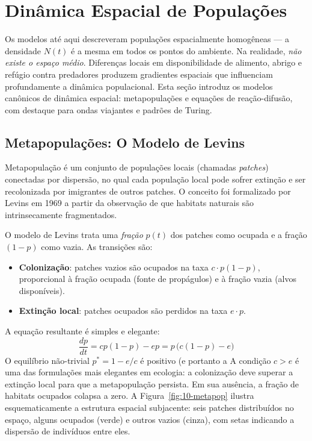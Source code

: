 \section{Dinâmica Espacial de Populações}
\label{sec:10-espaco}

Os modelos até aqui descreveram populações espacialmente homogêneas --- a
densidade $N(t)$ é a mesma em todos os pontos do ambiente. Na realidade,
\emph{não existe o espaço médio}. Diferenças locais em disponibilidade de
alimento, abrigo e refúgio contra predadores produzem gradientes espaciais
que influenciam profundamente a dinâmica populacional. Esta seção introduz
os modelos canônicos de dinâmica espacial: metapopulações e equações de
reação-difusão, com destaque para ondas viajantes e padrões de Turing.

\subsection{Metapopulações: O Modelo de Levins}
\label{sub:image10-metapop}

\begin{definicaoenv}[Metapopulação]
Metapopulação é um conjunto de populações locais (chamadas \emph{patches})
conectadas por dispersão, no qual cada população local pode sofrer extinção
e ser recolonizada por imigrantes de outros patches. O conceito foi
formalizado por Levins em 1969 a partir da observação de que habitats
naturais são intrinsecamente fragmentados.
\end{definicaoenv}

O modelo de Levins trata uma \emph{fração} $p(t)$ dos patches como ocupada
e a fração $(1 - p)$ como vazia. As transições são:
\begin{itemize}
\item \textbf{Colonização}: patches vazios são ocupados na taxa $c \cdot p(1 - p)$,
  proporcional à fração ocupada (fonte de propágulos) e à fração vazia
  (alvos disponíveis).
\item \textbf{Extinção local}: patches ocupados são perdidos na taxa $e \cdot p$.
\end{itemize}

A equação resultante é simples e elegante:
\begin{equation}
\frac{dp}{dt} = c p (1 - p) - e p = p\,\bigl(c(1 - p) - e\bigr)
\end{equation}
O equilíbrio não-trivial $p^* = 1 - e/c$ é positivo (e portanto a
A condição \emph{$c > e$} é uma das formulações mais elegantes em ecologia: a colonização deve
superar a extinção local para que a metapopulação persista. Em sua ausência,
a fração de habitats ocupados colapsa a zero. A Figura~\ref{fig:10-metapop}
ilustra esquematicamente a estrutura espacial subjacente: seis patches
distribuídos no espaço, alguns ocupados (verde) e outros vazios (cinza),
com setas indicando a dispersão de indivíduos entre eles.

